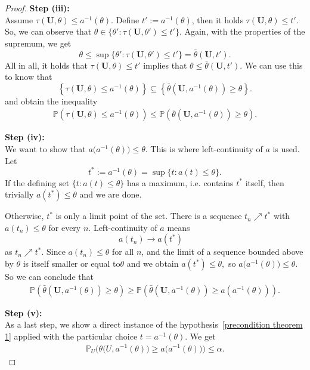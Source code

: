 \begin{proof}
	\textbf{Step (iii):} \\
	Assume $ \tau ( \mathbf U, \theta ) \leq a^{-1}(\theta)$. Define $t' := a^{-1}(\theta)$, then it holds $ \tau ( \mathbf U, \theta ) \leq t'$. So, we can observe that $\theta \in \{\theta' : \tau(\mathbf U, \theta') \leq t'\}$. Again, with the properties of the supremum, we get
	\[
		\theta \leq \sup \{\theta' : \tau(\mathbf U, \theta') \leq t'\}
		= \bar \theta (\mathbf U, t').
	\]
	All in all, it holds that $\tau (\mathbf U, \theta) \leq t'$ implies that $\theta \leq \bar \theta (\mathbf U, t')$. We can use this to know that 
	\[
			\left\{ 
				\tau (\mathbf U, \theta) \leq a^{-1} (\theta) 
			\right\}
		\subseteq
			\left\{ 
				\bar \theta \left( \mathbf U, a^{-1}(\theta) \right)  \geq \theta
			\right\}.
	\]
	and obtain the inequality
	\begin{align} \label{theorem 1: step iii}
		\mathbb{P} \left( \tau (\mathbf U, \theta) \leq a^{-1} (\theta) \right)
		\leq 
		\mathbb{P} \left( \bar \theta \left( \mathbf U, a^{-1}(\theta) \right)  \geq \theta \right).
	\end{align}
	

	
	
	\textbf{Step (iv):} \\
	We want to show that $a\big(a^{-1}(\theta)\big) \le \theta$.
	This is where left-continuity of $a$ is used. Let
	\[
	t^\ast := a^{-1}(\theta) = \sup\{t : a(t) \le \theta\}.
	\]
	If the defining set $\{t : a(t) \le \theta\}$ has a maximum, i.e. contains $t^\ast$ itself, then trivially $a(t^\ast) \le \theta$ and we are done.
	
	Otherwise, $t^\ast$ is only a limit point of the set. There is a sequence $t_n \nearrow t^\ast$ with $a(t_n) \le \theta$ for every $n$. Left-continuity of $a$ means
	\[
	a(t_n) \longrightarrow a(t^\ast) \quad
	\]
	as $t_n \nearrow t^\ast$.
	Since $a(t_n) \le \theta$ for all $n$, and the limit of a sequence bounded above by $\theta$ is itself smaller or equal to$\theta$ and we obtain
	\(
	a(t^\ast) \le \theta,
	\)
	so
	\(
	a\big(a^{-1}(\theta)\big) \le \theta.
	\)
	So we can conclude that 
	\begin{align} \label{theorem 1: step iv}
		\mathbb{P} \left( \bar \theta (\mathbf U, a^{-1}(\theta)) \geq \theta \right)
		\geq 
		\mathbb{P} \left( \bar \theta (\mathbf U, a^{-1}(\theta)) \geq a \left( a^{-1} (\theta) \right) \right).
	\end{align}
	
	
	\textbf{Step (v):} \\
	As a last step, we show a direct instance of the hypothesis~\eqref{precondition theorem 1}
	applied with the particular choice $t = a^{-1}(\theta)$.
	We get 
	\begin{align} \label{theorem 1: step v}
		\mathbb{P}_U\Big( \theta\big(U, a^{-1}(\theta)\big) \ge a\big(a^{-1}(\theta)\big) \Big) \le \alpha.
	\end{align}
	

\end{proof}
